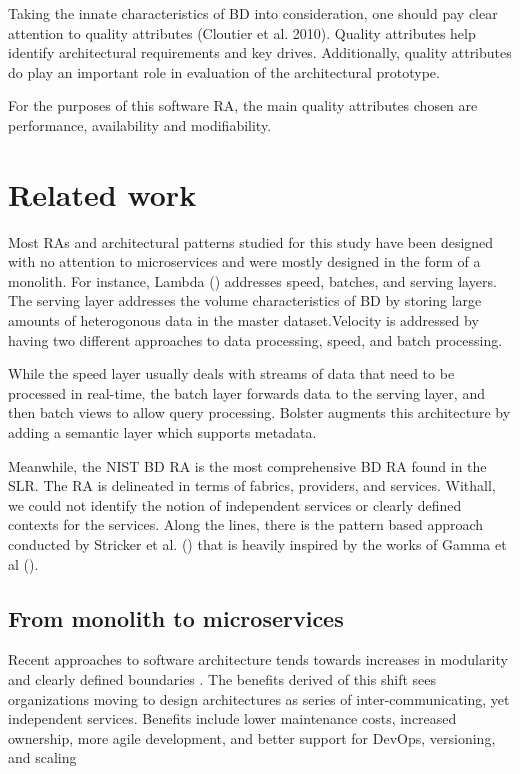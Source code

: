 \documentclass[10pt, conference]{IEEEtran}
\begin{document}
Taking the innate characteristics of BD into consideration, one should pay clear attention to quality attributes (Cloutier et al. 2010). Quality attributes help identify architectural requirements and key drives. Additionally, quality attributes do play an important role in evaluation of the architectural prototype.

For the purposes of this software RA, the main quality attributes chosen are performance, availability and modifiability.

\section{Related work}

Most RAs and architectural patterns studied for this study have been designed with no attention to microservices and were mostly designed in the form of a monolith. For instance, Lambda (\cite{Villari}) addresses speed, batches, and serving layers. The serving layer addresses the volume characteristics of BD by storing large amounts of heterogonous data in the master dataset.Velocity is addressed by having two different approaches to data processing, speed, and batch processing.

While the speed layer usually deals with streams of data that need to be processed in real-time, the batch layer forwards data to the serving layer, and then batch views to allow query processing. Bolster \cite{Nadal} augments this architecture by adding a semantic layer which supports metadata.

Meanwhile, the NIST BD RA \cite{Chang} is the most comprehensive BD RA found in the SLR. The RA is delineated in terms of fabrics, providers, and services. Withall, we could not identify the notion of independent services or clearly defined contexts for the services. Along the lines, there is the pattern based approach conducted by Stricker et al. (\cite{Stricker}) that is heavily inspired by the works of Gamma et al (\cite{Gamma}).

\subsection{From monolith to microservices}

Recent approaches to software architecture tends towards increases in modularity and clearly defined boundaries \cite{Jamshidi}. The benefits derived of this shift sees organizations moving to design architectures as series of inter-communicating, yet independent services. Benefits include lower maintenance costs, increased ownership, more agile development, and better support for DevOps, versioning, and scaling \cite{Fritzsch}
\end{document}
